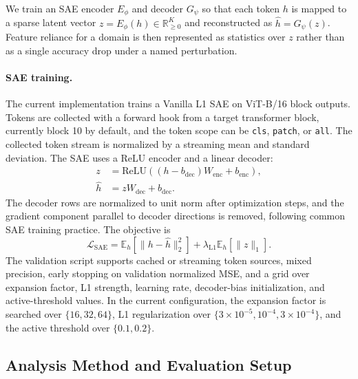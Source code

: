 \documentclass{article}
\begin{document}
We train an SAE encoder $E_\phi$ and decoder $G_\psi$ so that each token $h$ is mapped to a sparse latent vector $z=E_\phi(h)\in\mathbb{R}^{K}_{\ge 0}$ and reconstructed as $\hat{h}=G_\psi(z)$. Feature reliance for a domain is then represented as statistics over $z$ rather than as a single accuracy drop under a named perturbation.

\paragraph{SAE training.}

The current implementation trains a Vanilla L1 SAE on ViT-B/16 block outputs. Tokens are collected with a forward hook from a target transformer block, currently block 10 by default, and the token scope can be \texttt{cls}, \texttt{patch}, or \texttt{all}. The collected token stream is normalized by a streaming mean and standard deviation. The SAE uses a ReLU encoder and a linear decoder:
\begin{align}
z &= \mathrm{ReLU}((h-b_{\mathrm{dec}})W_{\mathrm{enc}} + b_{\mathrm{enc}}), \\
\hat{h} &= zW_{\mathrm{dec}} + b_{\mathrm{dec}}.
\end{align}
The decoder rows are normalized to unit norm after optimization steps, and the gradient component parallel to decoder directions is removed, following common SAE training practice. The objective is
\begin{equation}
\mathcal{L}_{\mathrm{SAE}} =
\mathbb{E}_{h}\left[\lVert h-\hat{h}\rVert_2^2\right]
+\lambda_{\mathrm{L1}}\mathbb{E}_{h}\left[\lVert z\rVert_1\right].
\end{equation}
The validation script supports cached or streaming token sources, mixed precision, early stopping on validation normalized MSE, and a grid over expansion factor, L1 strength, learning rate, decoder-bias initialization, and active-threshold values. In the current configuration, the expansion factor is searched over $\{16,32,64\}$, L1 regularization over $\{3\times 10^{-5},10^{-4},3\times 10^{-4}\}$, and the active threshold over $\{0.1,0.2\}$.

\subsection{Analysis Method and Evaluation Setup}
\end{document}

